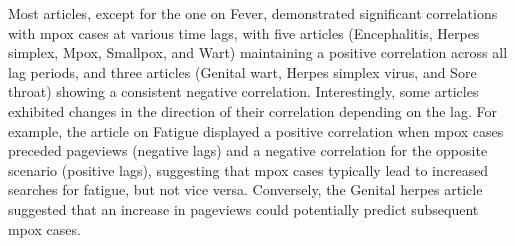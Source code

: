 \documentclass[
  12pt,
]{article}
\begin{document}
Most articles, except for the one on Fever, demonstrated significant
correlations with mpox cases at various time lags, with five articles
(Encephalitis, Herpes simplex, Mpox, Smallpox, and Wart) maintaining a
positive correlation across all lag periods, and three articles (Genital
wart, Herpes simplex virus, and Sore throat) showing a consistent
negative correlation. Interestingly, some articles exhibited changes in
the direction of their correlation depending on the lag. For example,
the article on Fatigue displayed a positive correlation when mpox cases
preceded pageviews (negative lags) and a negative correlation for the
opposite scenario (positive lags), suggesting that mpox cases typically
lead to increased searches for fatigue, but not vice versa. Conversely,
the Genital herpes article suggested that an increase in pageviews could
potentially predict subsequent mpox cases.~
\end{document}
